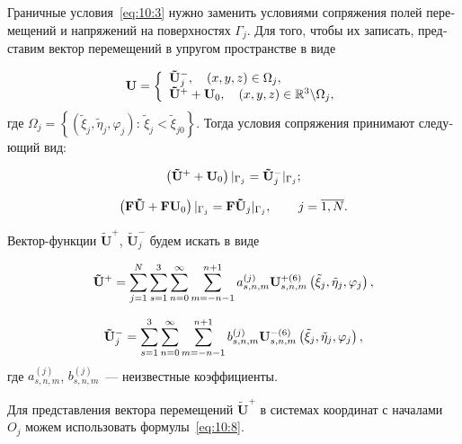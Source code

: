 \begin{russian}
Граничные условия~\eqref{eq:10:3} нужно заменить условиями сопряжения полей перемещений и напряжений на поверхностях $\Gamma_j$. Для того, чтобы их записать, представим вектор перемещений в упругом пространстве в виде

\begin{equation}
{\bf{U}} = \left\{ {\begin{array}{*{20}{l}}
{{\bf{\tilde U}}_j^ - ,\quad \left( {x,y,z} \right) \in {\Omega _j},}\\
{{{{\bf{\tilde U}}}^ + } + {{\bf{U}}_0},\quad \left( {x,y,z} \right) \in\mathbb{R}^3\backslash {\Omega _j},}
\end{array}} \right.
\label{eq:10:11}
\end{equation}
где ${\Omega _j} = \left\{ {\left( {{{\tilde \xi }_j},{{\tilde \eta }_j},{\varphi _j}} \right):\,{{\tilde \xi }_j} < {{\tilde \xi }_{j0}}} \right\}$. Тогда условия сопряжения принимают следующий вид:

\begin{equation}
\left( {{{{\bf{\tilde U}}}^ + } + {{\bf{U}}_0}} \right){|_{{\Gamma _j}}} = {\bf{\tilde U}}_j^ - {|_{{\Gamma _j}}};
\label{eq:10:9}
\end{equation}

\begin{equation}
\left( {{\bf{F\tilde U}} + {\bf{F}}{{\bf{U}}_0}} \right){|_{{\Gamma _j}}} = {\bf{F}}{{\bf{\tilde U}}_j}{|_{{\Gamma _j}}},\qquad {\kern 1pt} j = \overline {1,N}.
\label{eq:10:10}
\end{equation}

Вектор-функции $\mathbf{\tilde U}^+$, $\mathbf{\tilde U}_j^-$ будем искать в виде

\begin{equation}
{{\bf{\tilde U}}^ + } = \mathop \sum \limits_{j = 1}^N \sum\limits_{s = 1}^3 {\sum\limits_{n = 0}^\infty  {\sum\limits_{m =  - n - 1}^{n + 1} {a_{s,n,m}^{(j)}} } } {\bf{U}}_{s,n,m}^{ + (6)}\left( {{{\tilde \xi }_j},{{\tilde \eta }_j},{\varphi _j}} \right),
\end{equation}

\begin{equation}
{\bf{\tilde U}}_j^ -  = \sum\limits_{s = 1}^3 {\sum\limits_{n = 0}^\infty  {\sum\limits_{m =  - n - 1}^{n + 1} {b_{s,n,m}^{(j)}} } } {\bf{U}}_{s,n,m}^{ - (6)}\left( {{{\tilde \xi }_j},{{\tilde \eta }_j},{\varphi _j}} \right),
\end{equation}
где $a_{s,n,m}^{(j)}$, $b_{s,n,m}^{(j)}$~--- неизвестные коэффициенты.

Для представления вектора перемещений $\mathbf{\tilde U}^+$ в системах координат с началами $O_j$ можем использовать формулы~\eqref{eq:10:8}.


\end{russian}
